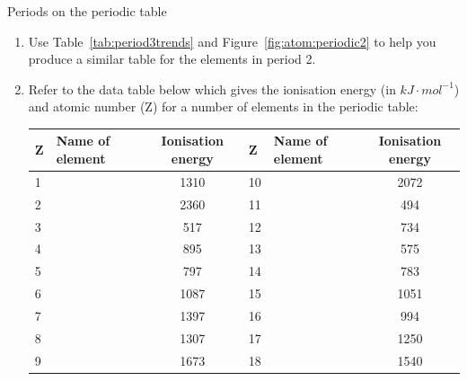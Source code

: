 \begin{exercises}{Periods on the periodic table} \noindent
\begin{enumerate}[noitemsep, label=\textbf{\arabic*}. ]
\item Use Table~\ref{tab:period3trends} and Figure~\ref{fig:atom:periodic2} to help you produce a similar table for the elements in period 2.
\item Refer to the data table below which gives the ionisation energy (in $kJ \cdot mol^{-1}$) and atomic number (Z) for a number of elements in the periodic table:\\
\begin{center}
\begin{tabular}{|l|l|c|l|l|c|}\hline
\textbf{Z} & Name of element & Ionisation energy & \textbf{Z} & Name of element & Ionisation energy \\\hline
1          &                 & 1310              & 10         &                 & 2072              \\\hline
2          &                 & 2360              & 11         &                 & 494               \\\hline
3          &                 & 517               & 12         &                 & 734               \\\hline
4          &                 & 895               & 13         &                 & 575               \\\hline
5          &                 & 797               & 14         &                 & 783               \\\hline
6          &                 & 1087              & 15         &                 & 1051              \\\hline
7          &                 & 1397              & 16         &                 & 994               \\\hline
8          &                 & 1307              & 17         &                 & 1250              \\\hline
9          &                 & 1673              & 18         &                 & 1540              \\\hline
\end{tabular}
\end{center}


\end{enumerate}
\end{exercises}
